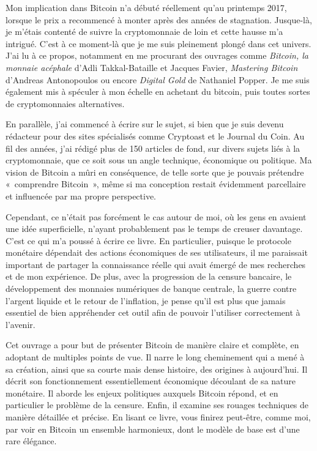 Mon implication dans Bitcoin n'a débuté réellement qu'au printemps 2017, lorsque le prix a recommencé à monter après des années de stagnation. Jusque-là, je m'étais contenté de suivre la cryptomonnaie de loin et cette hausse m'a intrigué. C'est à ce moment-là que je me suis pleinement plongé dans cet univers. J'ai lu à ce propos, notamment en me procurant des ouvrages comme \emph{Bitcoin, la monnaie acéphale} d'Adli Takkal-Bataille et Jacques Favier, \emph{Mastering Bitcoin} d'Andreas Antonopoulos ou encore \emph{Digital Gold} de Nathaniel Popper. Je me suis également mis à spéculer à mon échelle en achetant du bitcoin, puis toutes sortes de cryptomonnaies alternatives.

En parallèle, j'ai commencé à écrire sur le sujet, si bien que je suis devenu rédacteur pour des sites spécialisés comme Cryptoast et le Journal du Coin. Au fil des années, j'ai rédigé plus de 150 articles de fond, sur divers sujets liés à la cryptomonnaie, que ce soit sous un angle technique, économique ou politique. Ma vision de Bitcoin a mûri en conséquence, de telle sorte que je pouvais prétendre «~comprendre Bitcoin~», même si ma conception restait évidemment parcellaire et influencée par ma propre perspective.

Cependant, ce n'était pas forcément le cas autour de moi, où les gens en avaient une idée superficielle, n'ayant probablement pas le temps de creuser davantage. C'est ce qui m'a poussé à écrire ce livre. En particulier, puisque le protocole monétaire dépendait des actions économiques de ses utilisateurs, il me paraissait important de partager la connaissance réelle qui avait émergé de mes recherches et de mon expérience. De plus, avec la progression de la censure bancaire, le développement des monnaies numériques de banque centrale, la guerre contre l'argent liquide et le retour de l'inflation, je pense qu'il est plus que jamais essentiel de bien appréhender cet outil afin de pouvoir l'utiliser correctement à l'avenir.

Cet ouvrage a pour but de présenter Bitcoin de manière claire et complète, en adoptant de multiples points de vue. Il narre le long cheminement qui a mené à sa création, ainsi que sa courte mais dense histoire, des origines à aujourd'hui. Il décrit son fonctionnement essentiellement économique découlant de sa nature monétaire. Il aborde les enjeux politiques auxquels Bitcoin répond, et en particulier le problème de la censure. Enfin, il examine ses rouages techniques de manière détaillée et précise. En lisant ce livre, vous finirez peut-être, comme moi, par voir en Bitcoin un ensemble harmonieux, dont le modèle de base est d'une rare élégance.

